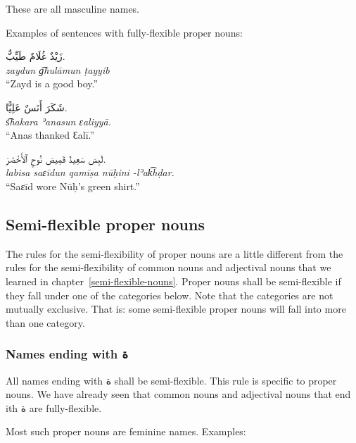 \documentclass[
  10pt,
]{book}
\begin{document}
These are all masculine names.

Examples of sentences with fully-flexible proper nouns:

\foreignlanguage{arabic}{زَيْدٌ غُلَامٌ طَيِّبٌّ.}\\
\emph{zaydun g͡hulāmun ṭayyib}\\
\enquote{Zayd is a good boy.}

\foreignlanguage{arabic}{شَکَرَ أَنَسٌ عَلِيًّا.}\\
\emph{s͡hakara ʾanasun ɛaliyyā.}\\
\enquote{Anas thanked Ɛalī.}

\foreignlanguage{arabic}{لَبِسَ سَعِيدٌ قَمِيصَ نُوحٍ ٱلأَخْضَرَ.}\\
\emph{labisa saɛīdun qamīṣa nūḥini -lʾak͡hḍar.}\\
\enquote{Saɛīd wore Nūḥ's green shirt.}

\subsection{Semi-flexible proper nouns}\label{semi-flexible-proper-nouns}

The rules for the semi-flexibility of proper nouns are a little different from the rules for the semi-flexibility of common nouns and adjectival nouns that we learned in chapter~\ref{semi-flexible-nouns}.
Proper nouns shall be semi-flexible if they fall under one of the categories below. Note that the categories are not mutually exclusive. That is: some semi-flexible proper nouns will fall into more than one category.

\subsubsection{\texorpdfstring{Names ending with \foreignlanguage{arabic}{ة}}{Names ending with ة}}\label{names-ending-with-ux629}

All names ending with \foreignlanguage{arabic}{ة} shall be semi-flexible. This rule is specific to proper nouns. We have already seen that common nouns and adjectival nouns that end ith \foreignlanguage{arabic}{ة} are fully-flexible.

Most such proper nouns are feminine names. Examples:
\end{document}
